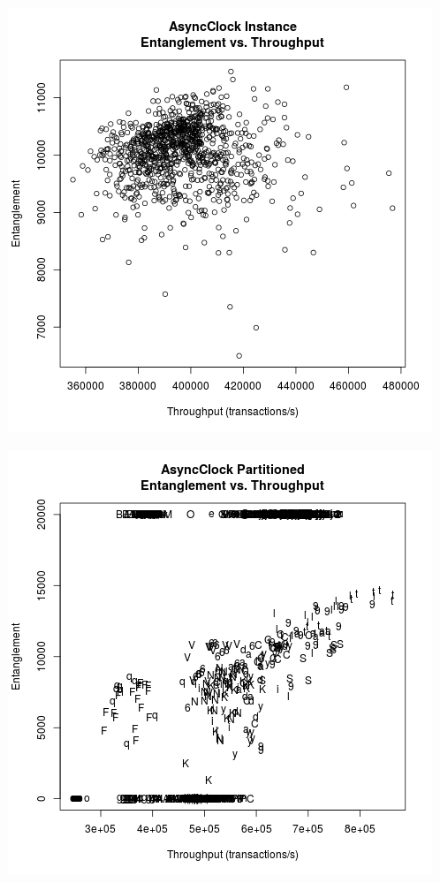 \begin{figure}
\center
\includegraphics[height=.25\textheight]{async_instance_throughput_entanglement.png}
\caption{\label{async_instance_throughput_entanglement}}
\end{figure}

\begin{figure}
\center
\includegraphics[height=.25\textheight]{async_partitioned_throughput_entanglement.png}
\caption{\label{async_partitioned_throughput_entanglement}}
\end{figure}

